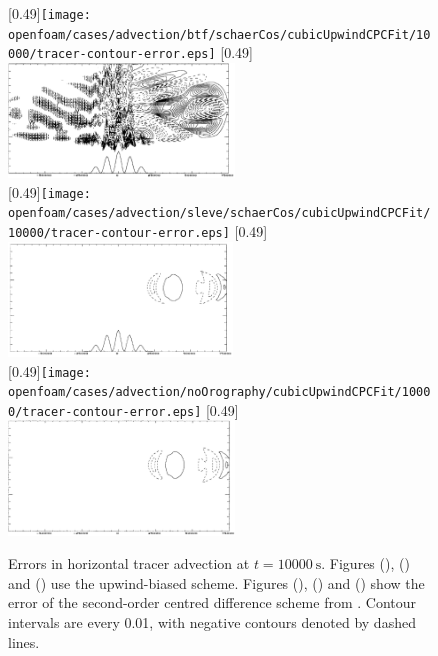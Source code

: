 \begin{figure}
	\captionsetup[subfigure]{position=b}
	\centering
	[0.49\textwidth]{\texttt{[image: openfoam/cases/advection/btf/schaerCos/cubicUpwindCPCFit/10000/tracer-contour-error.eps]}}
	\hfill
	[0.49\textwidth]{\vspace{0.1in}\includegraphics[height=1.2in]{img/schaer-btf-centred-error.png}} \\
%
	[0.49\textwidth]{\texttt{[image: openfoam/cases/advection/sleve/schaerCos/cubicUpwindCPCFit/10000/tracer-contour-error.eps]}}
	\hfill
	[0.49\textwidth]{\vspace{0.1in}\includegraphics[height=1.2in]{img/schaer-sleve-centred-error.png}} \\
%
	[0.49\textwidth]{\texttt{[image: openfoam/cases/advection/noOrography/cubicUpwindCPCFit/10000/tracer-contour-error.eps]}}
	\hfill
	[0.49\textwidth]{\vspace{0.1in}\includegraphics[height=1.2in]{img/schaer-noOrography-centred-error.png}} \\
%
	\caption{Errors in horizontal tracer advection at $t = \SI{10000}{\second}$.  Figures (\protect{}), (\protect{}) and (\protect{}) use the upwind-biased scheme.  Figures (\protect{}), (\protect{}) and (\protect{}) show the error of the second-order centred difference scheme from \textcite{schaer2002}.  Contour intervals are every 0.01, with negative contours denoted by dashed lines.}
	\label{fig:advection:error}
\end{figure}

